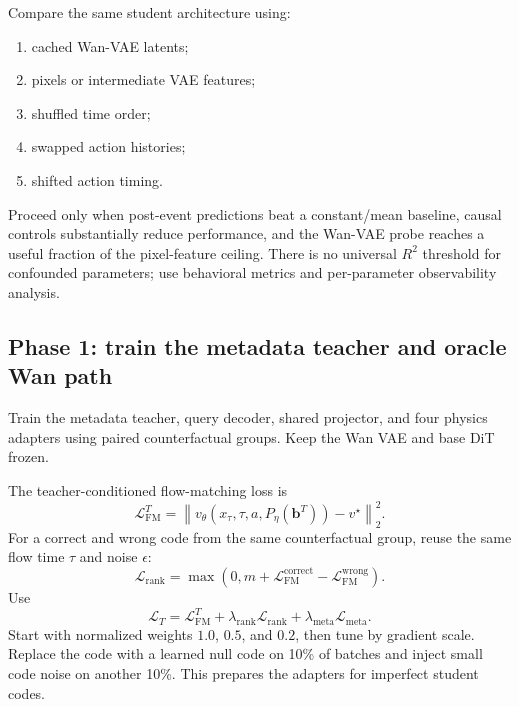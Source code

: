 \documentclass[11pt]{article}
\newcommand{\bvec}{\bm b}
\begin{document}
Compare the same student architecture using:
\begin{enumerate}
  \item cached Wan-VAE latents;
  \item pixels or intermediate VAE features;
  \item shuffled time order;
  \item swapped action histories;
  \item shifted action timing.
\end{enumerate}

\begin{gatebox}
Proceed only when post-event predictions beat a constant/mean baseline, causal
controls substantially reduce performance, and the Wan-VAE probe reaches a
useful fraction of the pixel-feature ceiling.  There is no universal $R^2$
threshold for confounded parameters; use behavioral metrics and per-parameter
observability analysis.
\end{gatebox}

\subsection{Phase 1: train the metadata teacher and oracle Wan path}

Train the metadata teacher, query decoder, shared projector, and four physics
adapters using paired counterfactual groups.  Keep the Wan VAE and base DiT
frozen.

The teacher-conditioned flow-matching loss is
\begin{equation}
  \mathcal L_{\mathrm{FM}}^T
  =\left\|v_\theta(x_\tau,\tau,a,P_\eta(\bvec^T))-v^\star\right\|_2^2.
\end{equation}
For a correct and wrong code from the same counterfactual group, reuse the same
flow time $\tau$ and noise $\epsilon$:
\begin{equation}
  \mathcal L_{\mathrm{rank}}
  =\max\left(0,m+
  \mathcal L_{\mathrm{FM}}^{\mathrm{correct}}
  -\mathcal L_{\mathrm{FM}}^{\mathrm{wrong}}\right).
  \label{eq:rank}
\end{equation}
Use
\begin{equation}
  \mathcal L_T=
  \mathcal L_{\mathrm{FM}}^T
  +\lambda_{\mathrm{rank}}\mathcal L_{\mathrm{rank}}
  +\lambda_{\mathrm{meta}}\mathcal L_{\mathrm{meta}}.
  \label{eq:teacher-total}
\end{equation}
Start with normalized weights $1.0$, $0.5$, and $0.2$, then tune by gradient
scale.  Replace the code with a learned null code on 10\% of batches and inject
small code noise on another 10\%.  This prepares the adapters for imperfect
student codes.
\end{document}

